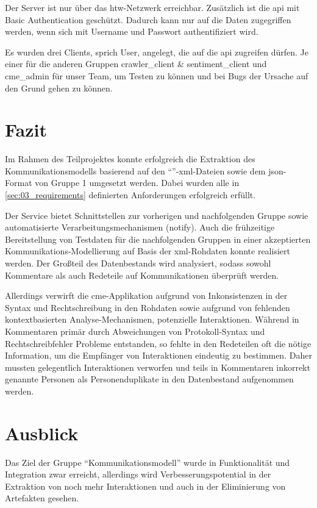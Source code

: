 Der Server ist nur über das \gls{htw}-Netzwerk erreichbar. Zusätzlich ist die \gls{api} mit
Basic Authentication geschützt. Dadurch kann nur auf die Daten zugegriffen
werden, wenn sich mit Username und Passwort authentifiziert wird.

Es wurden drei Clients, sprich User, angelegt, die auf die \gls{api} zugreifen
dürfen. Je einer für die anderen Gruppen crawler\_client \& sentiment\_client und
cme\_admin für unser Team, um Testen zu können und bei Bugs der Ursache auf den
Grund gehen zu können.


\section{Fazit}\label{sec:03_05_fazit}

Im Rahmen des Teilprojektes konnte erfolgreich die Extraktion des
Kommunikationsmodells basierend auf den
\enquote{}-\gls{xml}-Dateien sowie dem
\gls{json}-Format von Gruppe 1 umgesetzt werden. Dabei wurden alle in
\autoref{sec:03_requirements} definierten Anforderungen erfolgreich
erfüllt.

Der Service bietet Schnittstellen zur vorherigen und nachfolgenden Gruppe sowie
automatisierte Verarbeitungsmechanismen (notify). Auch die frühzeitige
Bereitstellung von Testdaten für die nachfolgenden Gruppen in einer akzeptierten
Kommunikations-Modellierung auf Basis der \gls{xml}-Rohdaten konnte realisiert
werden. Der Großteil des Datenbestands wird analysiert, sodass sowohl
Kommentare als auch Redeteile auf Kommunikationen überprüft werden.

Allerdings verwirft die \gls{cme}-Applikation aufgrund von Inkonsistenzen in
der Syntax und Rechtschreibung in den Rohdaten sowie aufgrund von fehlenden
kontextbasierten Analyse-Mechanismen, potenzielle Interaktionen. Während in
Kommentaren primär durch Abweichungen von Protokoll-Syntax und
Rechtschreibfehler Probleme entstanden, so fehlte in den Redeteilen oft die
nötige Information, um die Empfänger von Interaktionen eindeutig zu bestimmen.
Daher mussten gelegentlich Interaktionen verworfen und teils in Kommentaren
inkorrekt genannte Personen als Personenduplikate in den Datenbestand
aufgenommen werden.

\section{Ausblick}\label{sec:03_6_ausblick}

Das Ziel der Gruppe \enquote{Kommunikationsmodell} wurde in Funktionalität und
Integration zwar erreicht, allerdings wird Verbesserungspotential
in der Extraktion von noch mehr Interaktionen und auch in der Eliminierung von
Artefakten gesehen.

